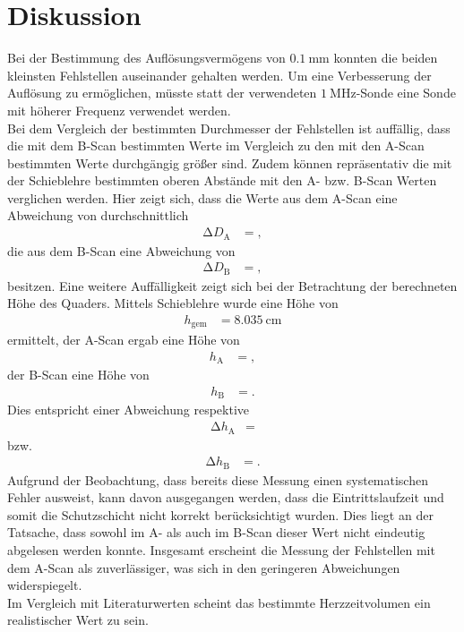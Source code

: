 \section{Diskussion}
\label{sec:Diskussion}
Bei der Bestimmung des Auflösungsvermögens von $\SI{0.1}{\milli\metre}$ konnten die beiden kleinsten Fehlstellen auseinander gehalten werden.
Um eine Verbesserung der Auflösung zu ermöglichen, müsste statt der verwendeten $\SI{1}{\mega\hertz}$-Sonde eine Sonde mit höherer Frequenz verwendet werden.\\
Bei dem Vergleich der bestimmten Durchmesser der Fehlstellen ist auffällig, dass die mit dem B-Scan bestimmten Werte im Vergleich zu den mit den A-Scan bestimmten Werte durchgängig größer sind.
Zudem können repräsentativ die mit der Schieblehre bestimmten oberen Abstände mit den A- bzw. B-Scan Werten verglichen werden.
Hier zeigt sich, dass die Werte aus dem A-Scan eine Abweichung von durchschnittlich
\begin{align*}
  \increment D_\text{A} &= ,
\end{align*}
die aus dem B-Scan eine Abweichung von
\begin{align*}
  \increment D_\text{B} &= ,
\end{align*}
besitzen.
Eine weitere Auffälligkeit zeigt sich bei der Betrachtung der berechneten Höhe des Quaders.
Mittels Schieblehre wurde eine Höhe von
\begin{align*}
  h_\text{gem} &= \SI{8.035}{\centi\metre}
\end{align*}
ermittelt, der A-Scan ergab eine Höhe von
\begin{align*}
  h_\text{A} &= ,
\end{align*}
der B-Scan eine Höhe von\begin{align*}
  h_\text{B} &= .
\end{align*}
Dies entspricht einer Abweichung respektive
\begin{align*}
  \increment h_\text{A} &= 
\end{align*}
bzw.
\begin{align*}
  \increment h_\text{B} &= .
\end{align*}
Aufgrund der Beobachtung, dass bereits diese Messung einen systematischen Fehler ausweist, kann davon ausgegangen werden, dass die Eintrittslaufzeit und somit die Schutzschicht nicht korrekt berücksichtigt wurden.
Dies liegt an der Tatsache, dass sowohl im A- als auch im B-Scan dieser Wert nicht eindeutig abgelesen werden konnte.
Insgesamt erscheint die Messung der Fehlstellen mit dem A-Scan als zuverlässiger, was sich in den geringeren Abweichungen widerspiegelt.\\
Im Vergleich mit Literaturwerten scheint das bestimmte Herzzeitvolumen ein realistischer Wert zu sein.
